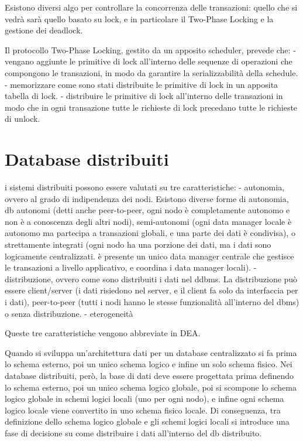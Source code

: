 Esistono diversi algo per controllare la concorrenza delle transazioni:
quello che si vedrà sarà quello basato su lock, e in particolare
il Two-Phase Locking e la gestione dei deadlock.

Il protocollo Two-Phase Locking, gestito da un apposito scheduler, prevede che:
- vengano aggiunte le primitive di lock all'interno delle sequenze di operazioni
che compongono le transazioni, in modo da garantire la serializzabilità della
schedule.
- memorizzare come sono stati distribuite le primitive di lock in un apposita
tabella di lock.
- distribuire le primitive di lock all'interno delle transazioni in modo
che in ogni transazione tutte le richieste di lock precedano tutte le richieste
di unlock.

\chapter{Database distribuiti}
i sistemi distribuiti possono essere valutati su tre caratteristiche:
- autonomia, ovvero al grado di indipendenza dei nodi. Esistono diverse
forme di autonomia, db autonomi (detti anche peer-to-peer, ogni nodo è completamente
autonomo e non è a conoscenza degli altri nodi), semi-autonomi (ogni data manager
locale è autonomo ma partecipa a transazioni globali, e una parte dei dati è condivisa),
o strettamente integrati (ogni nodo
ha una porzione dei dati, ma i dati sono logicamente centralizzati. è presente
un unico data manager centrale che gestisce le transazioni a livello applicativo,
e coordina i data manager locali).
- distribuzione, ovvero come sono distribuiti i dati nel ddbms. La distribuzione
può essere client/server (i dati risiedono nel server, e il client fa solo
da interfaccia per i dati), peer-to-peer (tutti i nodi hanno le stesse funzionalità
all'interno del dbms) o senza distribuzione.
- eterogeneità

Queste tre caratteristiche vengono abbreviate in DEA.

Quando si sviluppa un'architettura dati per un database centralizzato si fa prima
lo schema esterno, poi un unico schema logico e infine un solo schema fisico.
Nei database distribuiti, però, la base di dati deve essere progettata prima
definendo lo schema esterno, poi un unico schema logico globale, poi si scompone
lo schema logico globale in schemi logici locali (uno per ogni nodo), e infine
ogni schema logico locale viene convertito in uno schema fisico locale.
Di conseguenza, tra definizione dello schema logico globale e gli schemi logici
locali si introduce una fase di decisione su come distribuire i dati all'interno
del db distribuito.

